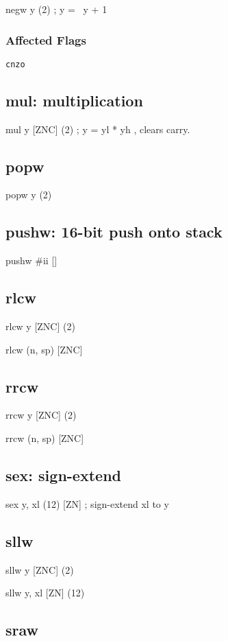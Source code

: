 \documentclass{book}
\begin{document}
negw y (2)      ; y = ~y + 1

\subsubsection*{Affected Flags}

\texttt{cnzo}


\subsection{mul: multiplication}

mul y [ZNC] (2)        ; y = yl * yh , clears carry.


\subsection{popw}

popw y (2)


\subsection{pushw: 16-bit push onto stack}

pushw \#ii []


\subsection{rlcw}

rlcw y [ZNC] (2)

rlcw (n, sp) [ZNC]


\subsection{rrcw}

rrcw y [ZNC] (2)

rrcw (n, sp) [ZNC]

\subsection{sex: sign-extend}

sex y, xl (12) [ZN]    ; sign-extend xl to y

\subsection{sllw}

sllw y [ZNC] (2)

sllw y, xl [ZN] (12)


\subsection{sraw}
\end{document}
